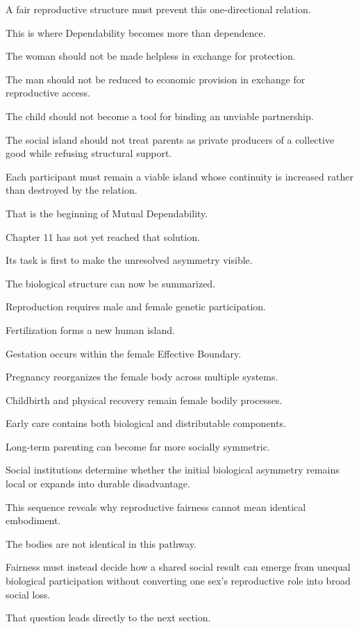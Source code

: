 A fair reproductive structure must prevent this one-directional relation.

This is where Dependability becomes more than dependence.

The woman should not be made helpless in exchange for protection.

The man should not be reduced to economic provision in exchange for reproductive access.

The child should not become a tool for binding an unviable partnership.

The social island should not treat parents as private producers of a collective good while refusing structural support.

Each participant must remain a viable island whose continuity is increased rather than destroyed by the relation.

That is the beginning of Mutual Dependability.

Chapter 11 has not yet reached that solution.

Its task is first to make the unresolved asymmetry visible.

The biological structure can now be summarized.

Reproduction requires male and female genetic participation.

Fertilization forms a new human island.

Gestation occurs within the female Effective Boundary.

Pregnancy reorganizes the female body across multiple systems.

Childbirth and physical recovery remain female bodily processes.

Early care contains both biological and distributable components.

Long-term parenting can become far more socially symmetric.

Social institutions determine whether the initial biological asymmetry remains local or expands into durable disadvantage.

This sequence reveals why reproductive fairness cannot mean identical embodiment.

The bodies are not identical in this pathway.

Fairness must instead decide how a shared social result can emerge from unequal biological participation without converting one sex’s reproductive role into broad social loss.

That question leads directly to the next section.

